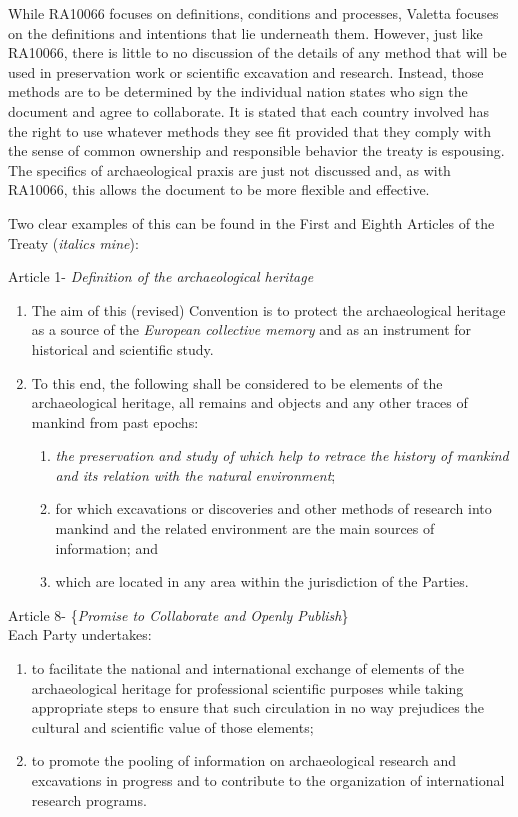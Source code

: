 \documentclass[english]{ijsra}
\begin{document}
While RA10066 focuses on definitions, conditions and processes, Valetta focuses on the definitions and intentions that lie underneath them. However, just like RA10066, there is little to no discussion of the details of any method that will be used in preservation work or scientific excavation and research. Instead, those methods are to be determined by the individual nation states who sign the document and agree to collaborate. It is stated that each country involved has the right to use whatever methods they see fit provided that they comply with the sense of common ownership and responsible behavior the treaty is espousing. The specifics of archaeological praxis are just not discussed and, as with RA10066, this allows the document to be more flexible and effective. 

Two clear examples of this can be found in the First and Eighth Articles of the Treaty (\textit{italics mine}): 

\begin{displayquote}
	Article 1- \textit{Definition of the archaeological heritage}
	\begin{enumerate}
		\item The aim of this (revised) Convention is to protect the archaeological heritage as a source of the \textit{European collective memory} and as an instrument for historical and scientific study.
		\item To this end, {the following} shall be considered to be elements of the archaeological heritage, all remains and objects and any other traces of mankind from past epochs:
		\begin{enumerate}
			\item \textit{the preservation and study of which help to retrace the history of mankind and its relation with the natural environment};
			\item for which excavations or discoveries and other methods of research into mankind and the related environment are the main sources of information; and
			\item which are located in any area within the jurisdiction of the Parties. \parencite[2]{Valetta_1992}
		\end{enumerate}
	\end{enumerate}
	Article 8- \{\textit{Promise to Collaborate and Openly Publish}\}\\
	Each Party undertakes:
	\begin{enumerate}
		\item to facilitate the national and international exchange of elements of the archaeological heritage for professional scientific purposes while taking appropriate steps to ensure that such circulation in no way prejudices the cultural and scientific value of those elements;
		\item to promote the pooling of information on archaeological research and excavations in progress and to contribute to the organization of international research programs. \parencite[4]{Valetta_1992}
	\end{enumerate}
\end{displayquote}
\end{document}
